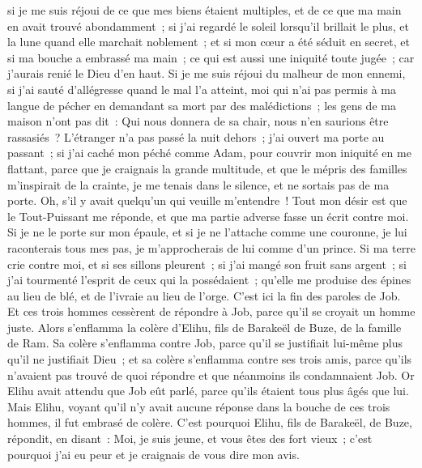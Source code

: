 \begin{multicols}{2}
si je me suis réjoui de ce que mes biens étaient multiples, et de ce que ma main en avait trouvé abondamment~;
si j'ai regardé le soleil lorsqu'il brillait le plus, et la lune quand elle marchait noblement~;
et si mon cœur a été séduit en secret, et si ma bouche a embrassé ma main~; 
ce qui est aussi une iniquité toute jugée~; car j'aurais renié le Dieu d'en haut.
Si je me suis réjoui du malheur de mon ennemi, si j'ai sauté d'allégresse quand le mal l'a atteint,
moi qui n'ai pas permis à ma langue de pécher en demandant sa mort par des malédictions~;
les gens de ma maison n'ont pas dit~: Qui nous donnera de sa chair, nous n'en saurions être rassasiés~?
L'étranger n'a pas passé la nuit dehors~; j'ai ouvert ma porte au passant~;
si j'ai caché mon péché comme Adam, pour couvrir mon iniquité en me flattant,
parce que je craignais la grande multitude, et que le mépris des familles m'inspirait de la crainte, je me tenais dans le silence, et ne sortais pas de ma porte.
Oh, s'il y avait quelqu'un qui veuille m'entendre~! Tout mon désir est que le Tout-Puissant me réponde, et que ma partie adverse fasse un écrit contre moi.
Si je ne le porte sur mon épaule, et si je ne l'attache comme une couronne,
je lui raconterais tous mes pas, je m'approcherais de lui comme d'un prince.
Si ma terre crie contre moi, et si ses sillons pleurent~;
si j'ai mangé son fruit sans argent~; si j'ai tourmenté l'esprit de ceux qui la possédaient~;
qu'elle me produise des épines au lieu de blé, et de l'ivraie au lieu de l'orge. C'est ici la fin des paroles de Job.
\VerseOne{}Et ces trois hommes cessèrent de répondre à Job, parce qu'il se croyait un homme juste. 
Alors s'enflamma la colère d'Elihu, fils de Barakeël de Buze, de la famille de Ram. Sa colère s'enflamma contre Job, parce qu'il se justifiait lui-même plus qu'il ne justifiait Dieu~; 
et sa colère s'enflamma contre ses trois amis, parce qu'ils n'avaient pas trouvé de quoi répondre et que néanmoins ils condamnaient Job. 
Or Elihu avait attendu que Job eût parlé, parce qu'ils étaient tous plus âgés que lui.
Mais Elihu, voyant qu'il n'y avait aucune réponse dans la bouche de ces trois hommes, il fut embrasé de colère.
C'est pourquoi Elihu, fils de Barakeël, de Buze, répondit, en disant~: Moi, je suis jeune, et vous êtes des fort vieux~; c'est pourquoi j'ai eu peur et je craignais de vous dire mon avis. 

\end{multicols}
